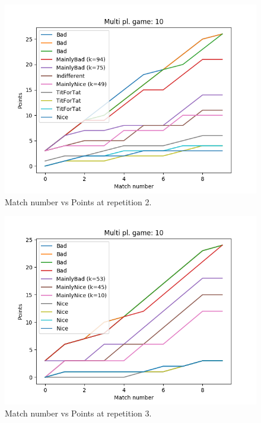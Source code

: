 \documentclass[journal,a4paper,10pt,twoside]{IEEEtran}
\begin{document}
\begin{figure}[ht]
    \centering
    \includegraphics[width=1\columnwidth]{../img/ripdmp-scores-10-r1.png}
    \caption{Match number vs Points at repetition 2.}
    \label{fig:rmpipd2}
\end{figure}

\begin{figure}[ht]
    \centering
    \includegraphics[width=1\columnwidth]{../img/ripdmp-scores-10-r2.png}
    \caption{Match number vs Points at repetition 3.}
    \label{fig:rmpipd3}
\end{figure}
\end{document}
